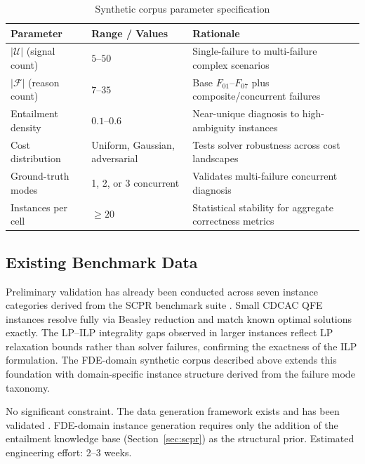 \documentclass[11pt,a4paper]{report}
\newcommand{\calU}{\mathcal{U}}
\newcommand{\calF}{\mathcal{F}}
\begin{document}
\begin{table}[htbp]
\centering
\caption{Synthetic corpus parameter specification}
\label{tab:instancespec}
\begin{tabular}{@{}lll@{}}
\toprule
\textbf{Parameter} & \textbf{Range / Values} & \textbf{Rationale} \\
\midrule
$|\calU|$ (signal count)  & $5$--$50$                         & Single-failure to multi-failure complex scenarios \\
$|\calF|$ (reason count)  & $7$--$35$                         & Base $F_{01}$--$F_{07}$ plus composite/concurrent failures \\
Entailment density        & $0.1$--$0.6$                      & Near-unique diagnosis to high-ambiguity instances \\
Cost distribution         & Uniform, Gaussian, adversarial    & Tests solver robustness across cost landscapes \\
Ground-truth modes        & 1, 2, or 3 concurrent             & Validates multi-failure concurrent diagnosis \\
Instances per cell        & $\geq 20$                         & Statistical stability for aggregate correctness metrics \\
\bottomrule
\end{tabular}
\end{table}

\subsection{Existing Benchmark Data}

Preliminary validation has already been conducted across seven instance categories derived
from the SCPR benchmark suite \citep{babatunde2025thesis}. Small CDCAC QFE instances
resolve fully via Beasley reduction and match known optimal solutions exactly. The
LP--ILP integrality gaps observed in larger instances reflect LP relaxation bounds rather
than solver failures, confirming the exactness of the ILP formulation. The FDE-domain
synthetic corpus described above extends this foundation with domain-specific instance
structure derived from the failure mode taxonomy.

\begin{tcolorbox}[enhanced, colback=lightgreen!40, colframe=forestgreen, arc=4pt,
  fonttitle=\bfseries, title={Viability: High}]
No significant constraint. The data generation framework exists and has been validated
\citep{babatunde2025thesis}. FDE-domain instance generation requires only the addition of
the entailment knowledge base (Section~\ref{sec:scpr}) as the structural prior.
Estimated engineering effort: 2--3 weeks.
\end{tcolorbox}
\end{document}
